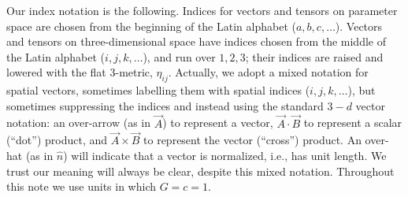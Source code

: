 \documentclass[11pt]{report}
\begin{document}
Our index notation is the following. Indices for vectors and
tensors on parameter space are chosen from the beginning of the
Latin alphabet ($a,b,c,\ldots$).
Vectors and tensors on three-dimensional space have indices
chosen from the middle of the Latin alphabet ($i,j,k,\ldots$),
and run over $1,2,3$; their indices are raised and lowered with
the flat 3-metric, $\eta_{ij}$.
Actually,  we adopt a mixed notation for spatial vectors, sometimes
labelling them with spatial indices ($i,j,k,\ldots$), but sometimes
suppressing the indices and instead
using the standard $3-d$ vector notation: an over-arrow (as in $\vec A$)
to represent a vector, $\vec A \cdot \vec B$ to represent
a scalar (``dot'') product, and $\vec A \times \vec B$
to represent the vector (``cross'') product.
An over-hat (as in $\hat n$)
will indicate that a vector is normalized, i.e., has unit length. We trust our
meaning will always be clear, despite this mixed notation.
Throughout this note we use units in which $G=c=1$.



\end{document}
